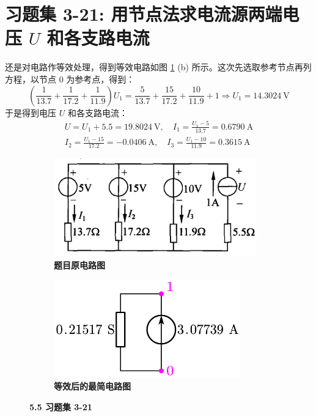 \documentclass[UTF8]{report}
\theoremstyle{MyLineTheoremStyle} %
\theoremstyle{MyBlockTheoremStyle} %
\theoremstyle{MySubsubsectionStyle} %
\begin{document}
\section{习题集 3-21: 用节点法求电流源两端电压 $U$ 和各支路电流 }

还是对电路作等效处理，得到等效电路如图 \ref{5.5 习题集 3-21} (b) 所示。这次先选取参考节点再列方程，以节点 0 为参考点，得到：
\begin{equation}
\left(\frac{1}{13.7} + \frac{1}{17.2} + \frac{1}{11.9}\right) U_1 = \frac{5}{13.7} + \frac{15}{17.2} + \frac{10}{11.9} + 1\Longrightarrow U_1 = 14.3024 \ \mathrm{V}
\end{equation}
于是得到电压 $U$ 和各支路电流：
\begin{align}
U = U_1 + 5.5 = 19.8024 \ \mathrm{V} ,\quad  
I_1 = \frac{U_1 - 5}{13.7} =  0.6790 \ \mathrm{A}\\ 
I_2 = \frac{U_1 - 15}{17.2} = -0.0406 \ \mathrm{A}, \quad 
I_3 = \frac{U_1 - 10}{11.9} = 0.3615 \ \mathrm{A}
\end{align}


\begin{figure}[H]\centering
\begin{subfigure}[t]{0.5\columnwidth}\centering
    \includegraphics[height=120pt]{assets/5/5.5 (1).png}
    \caption{\bfseries 题目原电路图 }
\end{subfigure}\hfill
\begin{subfigure}[t]{0.5\columnwidth}\centering
    \includegraphics[height=120pt]{assets/5/5.5 (2).png}
    \caption{\bfseries 等效后的最简电路图 }
\end{subfigure}
\caption{\bfseries 5.5 习题集 3-21 }\label{5.5 习题集 3-21}
\end{figure}
\end{document}
